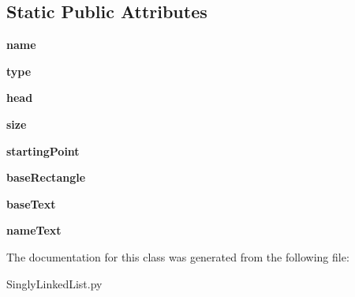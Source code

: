 \subsection*{Static Public Attributes}
\begin{DoxyCompactItemize}
\item 
\mbox{\label{class_singly_linked_list_1_1_singly_linked_list_a290bf002e85d460ea4d1b12eac95dccd}} 
{\bfseries name}
\item 
\mbox{\label{class_singly_linked_list_1_1_singly_linked_list_a523062fb5f8c37c3c55a3ac7bcb385cf}} 
{\bfseries type}
\item 
\mbox{\label{class_singly_linked_list_1_1_singly_linked_list_ae70237744ebaa52ad5d0fd4ad0553737}} 
{\bfseries head}
\item 
\mbox{\label{class_singly_linked_list_1_1_singly_linked_list_adef9daaead920d38b19c7f5a9e6f025f}} 
{\bfseries size}
\item 
\mbox{\label{class_singly_linked_list_1_1_singly_linked_list_a9b5e91c46108457bc497b06e781a0972}} 
{\bfseries starting\+Point}
\item 
\mbox{\label{class_singly_linked_list_1_1_singly_linked_list_a54b5b1f0bcb057e1b0e4380b27e4d882}} 
{\bfseries base\+Rectangle}
\item 
\mbox{\label{class_singly_linked_list_1_1_singly_linked_list_ab5991739cc77c0d955ec7abd3f885f16}} 
{\bfseries base\+Text}
\item 
\mbox{\label{class_singly_linked_list_1_1_singly_linked_list_a63451171839ddf5dea0beba8c3376b6c}} 
{\bfseries name\+Text}
\end{DoxyCompactItemize}


The documentation for this class was generated from the following file\+:\begin{DoxyCompactItemize}
\item 
Singly\+Linked\+List.\+py\end{DoxyCompactItemize}
